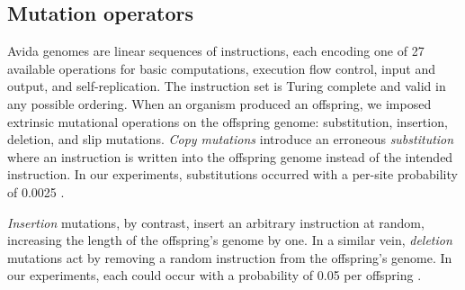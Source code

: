 \subsection{Mutation operators}

Avida genomes are linear sequences of instructions, each encoding one of 27 available operations for basic computations, execution flow control, input and output, and self-replication.
The instruction set is Turing complete and valid in any possible ordering.
When an organism produced an offspring, we imposed extrinsic mutational operations on the offspring genome: substitution, insertion, deletion, and slip mutations.
\textit{Copy mutations} introduce an erroneous \textit{substitution} where an instruction is written into the offspring genome instead of the intended instruction.
In our experiments, substitutions occurred with a per-site probability of 0.0025 \citep{Lenski2003Evolutionary}.

\textit{Insertion} mutations, by contrast, insert an arbitrary instruction at random, increasing the length of the offspring's genome by one.
In a similar vein, \textit{deletion} mutations act by removing a random instruction from the offspring's genome.
In our experiments, each could occur with a probability of 0.05 per offspring \citep{Lenski2003Evolutionary}.

